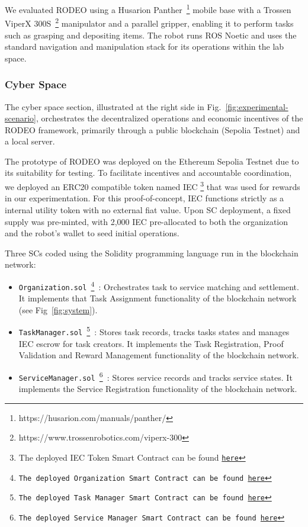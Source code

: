 \documentclass[letterpaper, 10 pt, conference]{ieeeconf}  %
\begin{document}
We evaluated RODEO using a Husarion Panther~\footnote{https://husarion.com/manuals/panther/} mobile base with a Trossen ViperX 300S~\footnote{https://www.trossenrobotics.com/viperx-300} manipulator and a parallel gripper, enabling it to perform tasks such as grasping and depositing items. The robot runs ROS Noetic and uses the standard navigation and manipulation stack for its operations within the lab space. 

\subsubsection{Cyber Space}
\label{sssec:cyber_space}
The cyber space section, illustrated at the right side in Fig.~\ref{fig:experimental-scenario}, orchestrates the decentralized operations and economic incentives of the RODEO framework, primarily through a public blockchain (Sepolia Testnet) and a local server.

The prototype of RODEO was deployed on the Ethereum Sepolia Testnet due to its suitability for testing. To facilitate incentives and accountable coordination, we deployed an ERC20 compatible token named IEC
\footnote{The deployed IEC Token Smart Contract can be found  \href{https://sepolia.etherscan.io/address/0x5D64497a14a5FD35A96F4B8c5AA6603DB56E913C}{\texttt{here}}} 
that was used for rewards in our experimentation. For this proof-of-concept, IEC functions strictly as a internal utility token with no external fiat value. Upon SC deployment, a fixed supply was pre-minted, with 2,000 IEC pre-allocated to both the organization and the robot's wallet to seed initial operations. 

Three SCs coded using the Solidity programming language run in the blockchain network:

\begin{itemize}
    \item \texttt{Organization.sol
    \footnote{The deployed Organization Smart Contract can be found \href{https://sepolia.etherscan.io/address/0xF204681dc989386646b542649E6b1B12De468e2F}{\texttt{here}}}
    }: Orchestrates task to service matching and settlement. It implements that Task Assignment functionality of the blockchain network (see Fig~\ref{fig:system}).
    \item \texttt{TaskManager.sol
    \footnote{The deployed Task Manager Smart Contract can be found \href{https://sepolia.etherscan.io/address/0x6F0B8122bCfaA2CB8E838458662cDdec74673399}{\texttt{here}}}
    }: Stores task records, tracks tasks states and manages IEC escrow for task creators. It implements the Task Registration, Proof Validation and Reward Management functionality of the blockchain network.
    \item \texttt{ServiceManager.sol
    \footnote{The deployed Service Manager Smart Contract can be found \href{https://sepolia.etherscan.io/address/0x7fa7c9651A7da4d342394026796f35Df4E10bF5F}{\texttt{here}}}
    }:  Stores service records and tracks service states. It implements the Service Registration functionality of the blockchain network.
\end{itemize}
\end{document}

